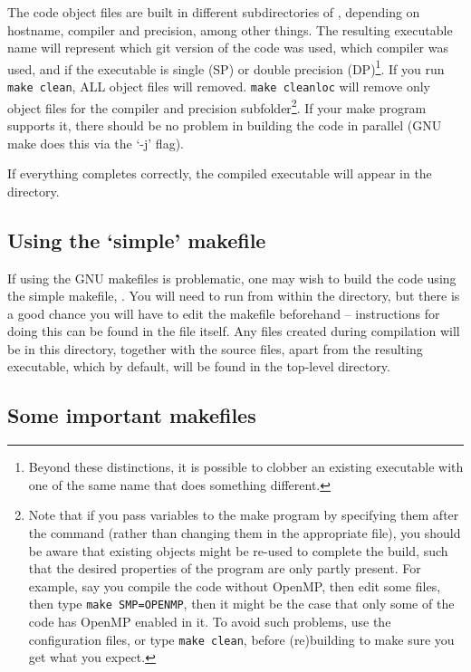 The code object files are built in different subdirectories of , 
depending on hostname, compiler and precision, among other things. The
resulting executable name will represent which git
version of the code was used, which compiler was used, and if the
executable is single (SP) or double precision (DP)\footnote{Beyond these 
distinctions, it is possible to clobber an
existing executable with one of the same name that does something different.
}. 
If you run \texttt{make clean}, ALL object files will removed.
\texttt{make cleanloc} will remove only object files for the compiler and
 precision subfolder\footnote{Note that if you pass variables to
the make program by specifying them after the command (rather than
changing them in the appropriate file), you should be aware that existing
objects might be re-used to complete the build, such that the desired
properties of the program are only partly present. For example, say you
compile the code without OpenMP, then edit some files, then type
\texttt{make SMP=OPENMP}, then it might be the case that only some of the
code has OpenMP enabled in it. To avoid such problems, use the configuration
files, or type \texttt{make clean}, before
 (re)building to make sure you get what you expect.}. 
If your make program supports it, there should be no problem in
building the code in parallel (GNU make does this via the `-j' flag).

If everything completes correctly, the compiled executable will appear in the 
 directory.


\subsection{Using the `simple' makefile}

If using the GNU makefiles is problematic, one may wish to build the code
using the simple makefile, . You will need to run
 from within the  directory, but there is a good chance
you will have to edit the makefile beforehand -- instructions for doing this
can be found in the file itself. Any files created during compilation will be
in this directory, together with the source files, apart from the resulting
executable, which by default, will be found in the top-level
directory.

\subsection{Some important makefiles}

